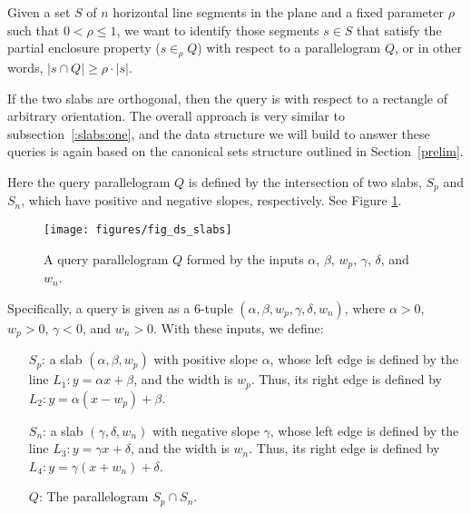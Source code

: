 \begin{problem}
Given a set $S$ of $n$ horizontal line segments in the plane and a fixed parameter 
$\rho$ such that $0 < \rho \leq 1$, we want to identify those segments $s \in S$ 
that satisfy 
the partial enclosure property ($s \in_\rho Q$) with respect to a parallelogram 
$Q$, or in other words,  $|s \cap Q| \geq \rho \cdot |s|$.
\end{problem}

If the two slabs are orthogonal, then the query is with respect to a 
rectangle of arbitrary orientation.  
The overall approach is very similar to subsection~\ref{:slabs:one}, and the 
data structure we will build to answer these queries is again based on the 
canonical sets structure outlined in Section~\ref{prelim}.



Here the query parallelogram $Q$ is defined by the intersection of two slabs, $S_p$ 
and $S_n$, which have positive and negative slopes, respectively. See Figure 
\ref{fig:slabs:two:ds}.

\begin{figure}[t]
\begin{center}
  \texttt{[image: figures/fig\_ds\_slabs]}
  \caption{A query parallelogram $Q$ formed by the inputs $\alpha$, $\beta$, 
$w_p$,
  $\gamma$, $\delta$, and $w_n$.}
  \label{fig:slabs:two:ds}
\end{center}
\end{figure}

Specifically, a query is given as a 6-tuple $(\alpha, \beta, w_p, \gamma, 
\delta, 
w_n)$, where $\alpha > 0$, $w_p > 0$, $\gamma < 0$, and $w_n > 0$. With these 
inputs, we define:

\begin{itemize}
 \item[$S_p$:] a slab $(\alpha,\beta,w_p)$ with positive slope $\alpha$, whose 
left edge is defined 
 by the line $L_1 : y = \alpha x + \beta$, and the width is $w_p$. Thus, its 
right edge 
 is defined by $L_2 : y = \alpha (x - w_p) + \beta$.
 \item[$S_n$:] a slab $(\gamma,\delta,w_n)$ with negative slope $\gamma$, whose 
left edge is defined 
 by the line $L_3 : y = \gamma x + \delta$, and the width is $w_n$. Thus, its 
right edge 
 is defined by $L_4 : y = \gamma (x + w_n) + \delta$.
 \item[$Q$:] The parallelogram $S_p \cap S_n$.
\end{itemize}



